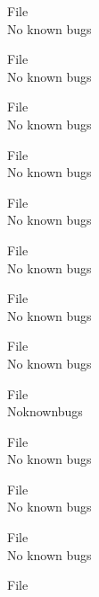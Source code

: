 \begin{DoxyRefList}
\item[File \doxylink{GHAMatrix_8cpp}{GHAMatrix.cpp} ]\hfill \\
\label{bug__bug000048}%
%
No known bugs  
\item[File \doxylink{GHAMatrix_8h}{GHAMatrix.h} ]\hfill \\
\label{bug__bug000012}%
%
No known bugs  
\item[File \doxylink{GLOBAL_8cpp}{GLOBAL.cpp} ]\hfill \\
\label{bug__bug000049}%
%
No known bugs  
\item[File \doxylink{GLOBAL_8h}{GLOBAL.h} ]\hfill \\
\label{bug__bug000013}%
%
No known bugs  
\item[File \doxylink{gmst_8cpp}{gmst.cpp} ]\hfill \\
\label{bug__bug000050}%
%
No known bugs  
\item[File \doxylink{gmst_8h}{gmst.h} ]\hfill \\
\label{bug__bug000014}%
%
No known bugs  
\item[File \doxylink{IERS_8cpp}{IERS.cpp} ]\hfill \\
\label{bug__bug000051}%
%
No known bugs  
\item[File \doxylink{IERS_8h}{IERS.h} ]\hfill \\
\label{bug__bug000015}%
%
No known bugs  
\item[File \doxylink{JPL__Eph__DE430_8cpp}{JPL\+\_\+\+Eph\+\_\+\+DE430.cpp} ]\hfill \\
\label{bug__bug000052}%
%
Noknownbugs  
\item[File \doxylink{JPL__Eph__DE430_8h}{JPL\+\_\+\+Eph\+\_\+\+DE430.h} ]\hfill \\
\label{bug__bug000016}%
%
No known bugs  
\item[File \doxylink{Legendre_8cpp}{Legendre.cpp} ]\hfill \\
\label{bug__bug000053}%
%
No known bugs  
\item[File \doxylink{Legendre_8h}{Legendre.h} ]\hfill \\
\label{bug__bug000017}%
%
No known bugs  
\item[File \doxylink{LTC_8cpp}{LTC.cpp} ]\hfill \\

\end{DoxyRefList}
